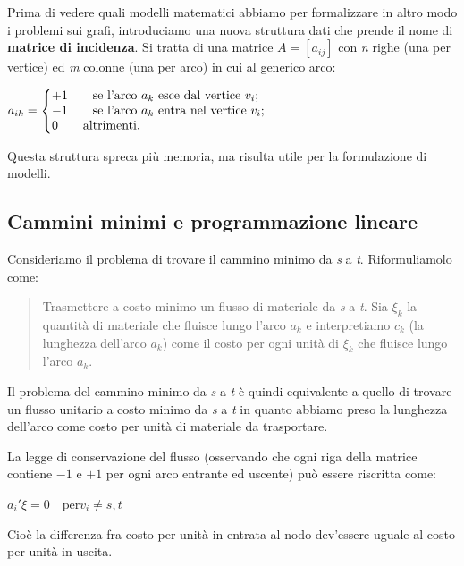 \documentclass[11pt]{book}
\makeatletter
\newenvironment{sistema}%
{\left\lbrace\begin{array}{@{}l@{}}}%
{\end{array}\right.}
\makeatother
\begin{document}
Prima di vedere quali modelli matematici abbiamo per formalizzare in
altro modo i problemi sui grafi, introduciamo una nuova struttura
dati che prende il nome di {\bf matrice di incidenza}. Si tratta di
una matrice $A = [a_{ij}]$ con {\em n} righe (una per vertice) ed {\em
  m} colonne (una per arco) in cui al generico arco:

\begin{center}
  $a_{ik} = \begin{sistema}
    +1 \qquad  \text{se l'arco $a_k$ esce dal vertice $v_i$};\\
    -1 \qquad  \text{se l'arco $a_k$ entra nel vertice $v_i$};\\
    0 \qquad \text{altrimenti}.
  \end{sistema}$
\end{center}

Questa struttura spreca pi\`u memoria, ma risulta utile per la
formulazione di modelli.

\subsection{Cammini minimi e programmazione lineare}

Consideriamo il problema di trovare il cammino minimo da {\em s} a
{\em t}. Riformuliamolo come:

\begin{quote}
Trasmettere a costo minimo un flusso di materiale da {\em s} a {\em
  t}. Sia $\xi_k$ la quantit\`a di materiale che fluisce lungo l'arco
$a_k$ e interpretiamo $c_k$ (la lunghezza dell'arco $a_k$) come il
costo per ogni unit\`a di $\xi_k$ che fluisce lungo l'arco $a_k$.
\end{quote}

Il problema del cammino minimo da {\em s} a {\em t} \`e quindi
equivalente a quello di trovare un flusso unitario a costo minimo da
{\em s} a {\em t} in quanto abbiamo preso la lunghezza dell'arco come
costo per unit\`a di materiale da trasportare.

La legge di conservazione del flusso (osservando che ogni riga della
matrice contiene $-1$ e $+1$ per ogni arco entrante ed uscente) pu\`o
essere riscritta come:

\begin{center}
$a_i'\xi = 0 \quad \text{per} v_i \neq s,t$  
\end{center}

Cio\`e la differenza fra costo per unit\`a in entrata al nodo
dev'essere uguale al costo per unit\`a in uscita.
\end{document}
